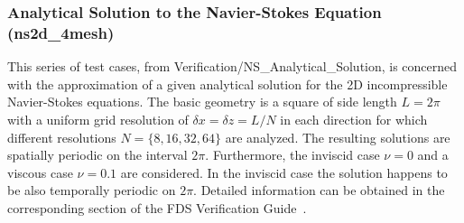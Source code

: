 \subsubsection{Analytical Solution to the Navier-Stokes Equation ({\ct ns2d\_4mesh})}

This series of test cases, from Verification/NS\_Analytical\_Solution, is concerned with the approximation of a given analytical solution for the 2D incompressible Navier-Stokes equations. 
%
The basic geometry is a square of side length $L=2\pi$ with a uniform grid resolution of $\delta x = \delta z = L/N$ in each direction for which different resolutions $N =\{8,16,32,64\}$ are analyzed.  The resulting solutions are spatially periodic on the interval $2\pi$. Furthermore, the inviscid case $\nu=0$ and a viscous case $\nu=0.1$ are considered. In the inviscid case the solution happens to be also temporally periodic on $2\pi$.
Detailed information can be obtained in the corresponding section of the FDS Verification Guide~\cite{McGrattan:2018:VG}.


